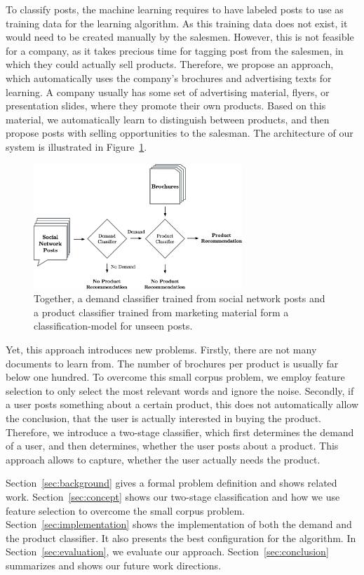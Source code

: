 To classify posts, the machine learning requires to have labeled posts to use as training data for the learning algorithm.
As this training data does not exist, it would need to be created manually by the salesmen.
However, this is not feasible for a company, as it takes precious time for tagging post from the salesmen, in which they could actually sell products.
Therefore, we propose an approach, which automatically uses the company's brochures and advertising texts for learning.
A company usually has some set of advertising material, flyers, or presentation slides, where they promote their own products.
Based on this material, we automatically learn to distinguish between products, and then propose posts with selling opportunities to the salesman.
The architecture of our system is illustrated in Figure~\ref{fig:figureone}.


\begin{figure}
	\begin{center}
		\includegraphics[width=0.7\textwidth]{figures/nto_workflow.eps}
	\end{center}
	\caption{Together, a demand classifier trained from social network posts and a product classifier trained from marketing material form a classification-model for unseen posts.}
	\label{fig:figureone}
\end{figure}

Yet, this approach introduces new problems.
Firstly, there are not many documents to learn from.
The number of brochures per product is usually far below one hundred.
To overcome this small corpus problem, we employ feature selection to only select the most relevant words and ignore the noise.
Secondly, if a user posts something about a certain product, this does not automatically allow the conclusion, that the user is actually interested in buying the product.
Therefore, we introduce a two-stage classifier, which first determines the demand of a user, and then determines, whether the user posts about a product.
This approach allows to capture, whether the user actually needs the product.

Section~\ref{sec:background} gives a formal problem definition and shows related work.
Section~\ref{sec:concept} shows our two-stage classification and how we use feature selection to overcome the small corpus problem.
Section~\ref{sec:implementation} shows the implementation of both the demand and the product classifier.
It also presents the best configuration for the algorithm.
In Section~\ref{sec:evaluation}, we evaluate our approach.
Section~\ref{sec:conclusion} summarizes and shows our future work directions.
